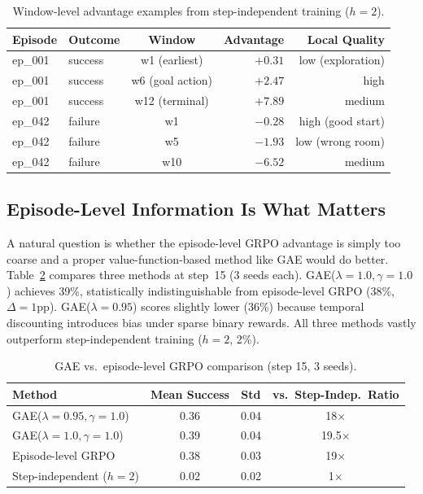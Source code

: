 \documentclass[10pt]{article}
\begin{document}
\begin{table}[h]
\centering
\caption{Window-level advantage examples from step-independent training ($h{=}2$).}
\label{tab:window_examples}
\begin{tabular}{llcrr}
\toprule
Episode & Outcome & Window & Advantage & Local Quality \\
\midrule
ep\_001 & success & w1 (earliest)    & $+0.31$ & low (exploration) \\
ep\_001 & success & w6 (goal action) & $+2.47$ & high \\
ep\_001 & success & w12 (terminal)   & $+7.89$ & medium \\
\midrule
ep\_042 & failure & w1               & $-0.28$ & high (good start) \\
ep\_042 & failure & w5               & $-1.93$ & low (wrong room) \\
ep\_042 & failure & w10              & $-6.52$ & medium \\
\bottomrule
\end{tabular}
\end{table}

\subsection{Episode-Level Information Is What Matters}
\label{sec:gae}

A natural question is whether the episode-level GRPO advantage is simply too coarse and a proper value-function-based method like GAE would do better. Table~\ref{tab:gae} compares three methods at step~15 (3 seeds each). GAE($\lambda{=}1.0, \gamma{=}1.0$) achieves 39\%, statistically indistinguishable from episode-level GRPO (38\%, $\Delta = 1$pp). GAE($\lambda{=}0.95$) scores slightly lower (36\%) because temporal discounting introduces bias under sparse binary rewards. All three methods vastly outperform step-independent training ($h{=}2$, 2\%).

\begin{table}[h]
\centering
\caption{GAE vs.\ episode-level GRPO comparison (step 15, 3 seeds).}
\label{tab:gae}
\begin{tabular}{lccc}
\toprule
Method & Mean Success & Std & vs.\ Step-Indep.\ Ratio \\
\midrule
GAE($\lambda{=}0.95, \gamma{=}1.0$) & 0.36 & 0.04 & 18$\times$ \\
GAE($\lambda{=}1.0, \gamma{=}1.0$) & 0.39 & 0.04 & 19.5$\times$ \\
Episode-level GRPO & 0.38 & 0.03 & 19$\times$ \\
Step-independent ($h{=}2$) & 0.02 & 0.02 & 1$\times$ \\
\bottomrule
\end{tabular}
\end{table}
\end{document}
